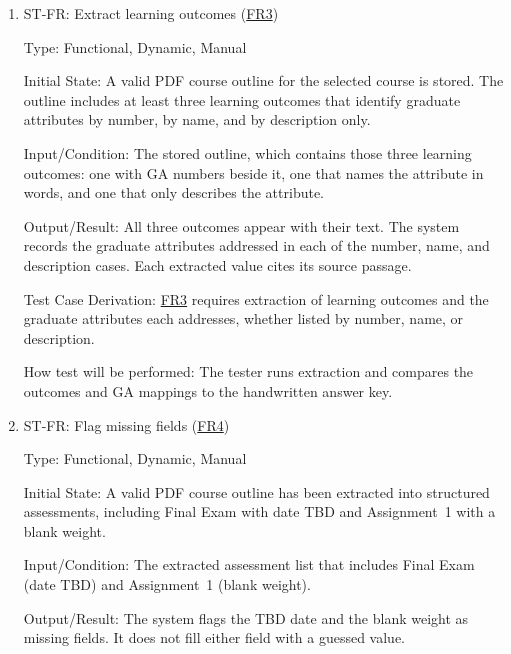 \documentclass[12pt, titlepage]{article}
\newcounter{stnum}
\newcommand{\frlink}[1]{\href{https://github.com/shivyam/cas-course-optimization/blob/main/pdfs/SRS-IEEE/SRS.pdf}{FR#1}}
\begin{document}
\begin{enumerate}
Test Case Derivation: \frlink{2} requires extraction of each assessment's name, type, date, and weight. The blank weight and TBD date also set up \frlink{4}.

How test will be performed: The tester runs extraction and compares the structured result to a handwritten answer key for that PDF.


\item{ST-FR\thestnum \label{ST_Extract_LO}: Extract learning outcomes (\frlink{3})\\}

Type: Functional, Dynamic, Manual

Initial State: A valid PDF course outline for the selected course is stored. The outline includes at least three learning outcomes that identify graduate attributes by number, by name, and by description only.

Input/Condition: The stored outline, which contains those three learning outcomes: one with GA numbers beside it, one that names the attribute in words, and one that only describes the attribute.

Output/Result: All three outcomes appear with their text. The system records the graduate attributes addressed in each of the number, name, and description cases. Each extracted value cites its source passage.

Test Case Derivation: \frlink{3} requires extraction of learning outcomes and the graduate attributes each addresses, whether listed by number, name, or description.

How test will be performed: The tester runs extraction and compares the outcomes and GA mappings to the handwritten answer key.


\item{ST-FR\thestnum \label{ST_Extract_Flag}: Flag missing fields (\frlink{4})\\}

Type: Functional, Dynamic, Manual

Initial State: A valid PDF course outline has been extracted into structured assessments, including Final Exam with date TBD and Assignment~1 with a blank weight.

Input/Condition: The extracted assessment list that includes Final Exam (date TBD) and Assignment~1 (blank weight).

Output/Result: The system flags the TBD date and the blank weight as missing fields. It does not fill either field with a guessed value.


\end{enumerate}
\end{document}
